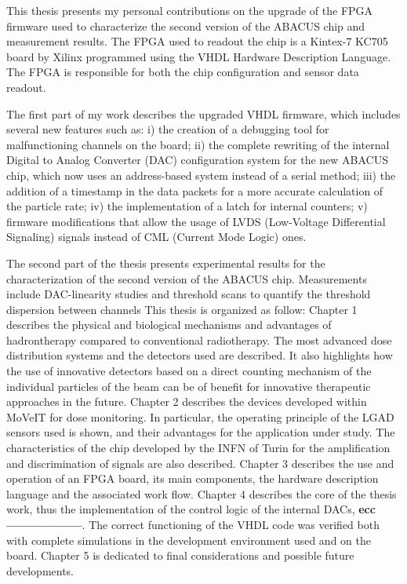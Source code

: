 This thesis presents my personal contributions on the upgrade of the FPGA firmware used to characterize
the second version of the ABACUS chip and measurement results.
The FPGA used to readout the chip is a Kintex-7 KC705 board by Xilinx programmed using the VHDL Hardware Description Language. The FPGA
is responsible for both the chip configuration and sensor data readout.

\noindent The first part of my work describes the upgraded VHDL firmware, which includes several new features such as:
i) the creation of a debugging tool for malfunctioning channels on the board;
ii) the complete rewriting of the internal Digital to Analog Converter (DAC) configuration system for the new ABACUS chip, which
now uses an address-based system instead of a serial method;
iii) the addition of a timestamp in the data packets for a more accurate calculation of the particle rate;
iv) the implementation of a latch for internal counters;
v) firmware modifications that allow the usage of LVDS (Low-Voltage Differential Signaling) signals instead of CML (Current Mode Logic) ones.

The second part of the thesis presents experimental results for the characterization of the second version of the ABACUS chip.
Measurements include DAC-linearity studies and threshold scans to quantify the threshold dispersion between channels
\vspace{1cm}
\newline
This thesis is organized as follow:
\vspace{0.25cm}
\newline
Chapter 1 describes the physical and biological mechanisms and advantages of hadrontherapy compared to conventional radiotherapy. The most advanced dose distribution systems and the detectors used are described. It also highlights how the use of innovative detectors based on a direct counting mechanism of the individual particles of the beam can be of benefit for innovative therapeutic approaches in the future.
\vspace{0.25cm}
\newline
Chapter 2 describes the devices developed within MoVeIT for dose monitoring. In particular, the operating principle of the LGAD sensors used is shown, and their advantages for the application under study. The characteristics of the chip developed by the INFN of Turin for the amplification and discrimination of signals are also described.
\vspace{0.25cm}
\newline
Chapter 3 describes the use and operation of an FPGA board, its main components, the hardware description language and the associated work flow.
\vspace{0.25cm}
\newline
Chapter 4 describes the core of the thesis work, thus the implementation of the control logic of the internal DACs, \textbf{ecc------------------}. The correct functioning of the VHDL code was verified both with complete simulations in the development environment used and on the board.
\vspace{0.25cm}
\newline
Chapter 5 is dedicated to final considerations and possible future developments.
